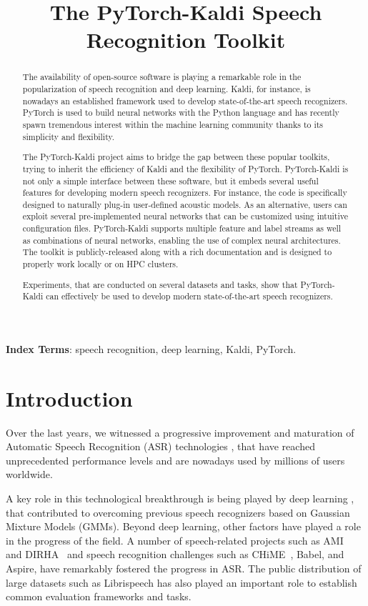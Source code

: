 \documentclass{article}
\title{The PyTorch-Kaldi Speech Recognition Toolkit}
\begin{document}
\ninept
\maketitle
\begin{abstract}
The availability of open-source software is playing a remarkable role in the popularization of speech recognition and deep learning. Kaldi, for instance, is nowadays an established framework used to develop state-of-the-art speech recognizers. PyTorch is used to build neural networks with the Python language and has recently spawn tremendous interest within the machine learning community thanks to its simplicity and flexibility.

The PyTorch-Kaldi project aims to bridge the gap between these popular toolkits, trying to inherit the efficiency of Kaldi and the flexibility of PyTorch. PyTorch-Kaldi is not only a simple interface between these software, but it embeds several useful features for developing modern speech recognizers. For instance, the code is specifically designed to naturally plug-in user-defined acoustic models. As an alternative, users can exploit several pre-implemented neural networks that can be customized using intuitive configuration files. PyTorch-Kaldi  supports multiple feature and label streams as well as combinations of neural networks, enabling the use of complex neural architectures. The toolkit is publicly-released along with a rich documentation and is designed to properly work locally or on HPC clusters.

Experiments, that are conducted on several datasets and tasks, show that PyTorch-Kaldi can effectively be used to develop modern state-of-the-art speech recognizers.



\end{abstract}
\noindent\textbf{Index Terms}: speech recognition, deep learning, Kaldi, PyTorch.

\section{Introduction}
Over the last years, we witnessed a progressive improvement and maturation of Automatic Speech Recognition (ASR) technologies \cite{lideng,ravanelli_thesis}, that have reached unprecedented performance levels and are nowadays used by millions of users worldwide. 

A key role in this technological breakthrough is being played by deep learning \cite{Goodfellow-et-al-2016-Book}, that contributed to overcoming previous speech recognizers based on Gaussian Mixture Models (GMMs).
Beyond deep learning, other factors have played a role in the progress of the field. A number of speech-related projects such as AMI~\cite{ami} and DIRHA~\cite{lrec} and speech recognition challenges such as CHiME~\cite{chime3}, Babel, and Aspire, have remarkably fostered the progress in ASR. The public distribution of large datasets such as Librispeech \cite{librispeech} has also played an important role to establish common evaluation frameworks and tasks. 
\end{document}
